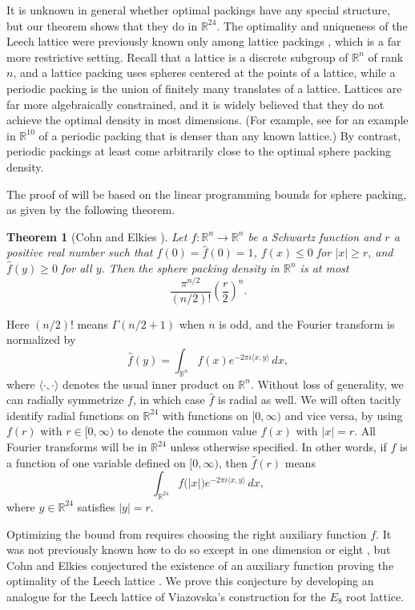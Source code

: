 \documentclass{aomart}
\theoremstyle{plain}
\newtheorem{theorem}{Theorem}
\numberwithin{theorem}{section}
\numberwithin{equation}{section}
\newcommand{\R}{{\mathbb R}}
\begin{document}
It is unknown in general whether optimal packings have any special structure,
but our theorem shows that they do in $\R^{24}$. The optimality and
uniqueness of the Leech lattice were previously known only among lattice
packings \cite{CK}, which is a far more restrictive setting. Recall that a
lattice is a discrete subgroup of $\R^n$ of rank $n$, and a lattice packing
uses spheres centered at the points of a lattice, while a periodic packing is
the union of finitely many translates of a lattice. Lattices are far more
algebraically constrained, and it is widely believed that they do not achieve
the optimal density in most dimen\-sions. (For example, see
\cite[p.~140]{SPLAG} for an example in $\R^{10}$ of a periodic packing that
is denser than any known lattice.) By contrast, periodic packings at least
come arbitrarily close to the optimal sphere packing density.

The proof of  will be based on the linear
programming bounds for sphere packing, as given by the following theorem.

\begin{theorem}[Cohn and Elkies \cite{CE}] \label{thm:LP}
Let $f \colon \R^n \to \R^n$ be a Schwartz function and $r$ a positive real
number such that $f(0) = \widehat{f}(0)=1$, $f(x) \le 0$ for $|x| \ge r$, and
$\widehat{f}(y) \ge 0$ for all $y$.  Then the sphere packing density in
$\R^n$ is at most
\[
\frac{\pi^{n/2}}{(n/2)!}\left(\frac{r}{2}\right)^n.
\]
\end{theorem}

Here $(n/2)!$ means $\Gamma(n/2+1)$ when $n$ is odd, and the Fourier
transform is normalized by
\[
\widehat{f}(y) = \int_{\R^n} f(x) e^{-2\pi i \langle x,y \rangle} \, dx,
\]
where $\langle \cdot, \cdot \rangle$ denotes the usual inner product on
$\R^n$.  Without loss of generality, we can radially symmetrize $f$, in
which case $\widehat{f}$ is radial as well. We will often tacitly identify
radial functions on $\R^{24}$ with functions on $[0,\infty)$ and vice versa,
by using $f(r)$ with $r \in [0,\infty)$ to denote the common value $f(x)$
with $|x|=r$. All Fourier transforms will be in $\R^{24}$ unless otherwise
specified. In other words, if $f$ is a function of one variable defined on
$[0,\infty)$, then $\widehat{f}(r)$ means
\[
\int_{\R^{24}} f\big(|x|\big) e^{-2\pi i \langle x,y \rangle} \, dx,
\]
where $y \in \R^{24}$ satisfies $|y|=r$.

Optimizing the bound from  requires choosing the
right aux\-iliary function $f$.  It was not previously known how to do so
except in one dimension \cite{CE} or eight \cite{V}, but Cohn and Elkies
conjectured the existence of an auxiliary function proving the optimality of
the Leech lattice \cite{CE}. We prove this conjecture by developing an
analogue for the Leech lattice of Viazovska's construction for the $E_8$ root
lattice.
\end{document}

